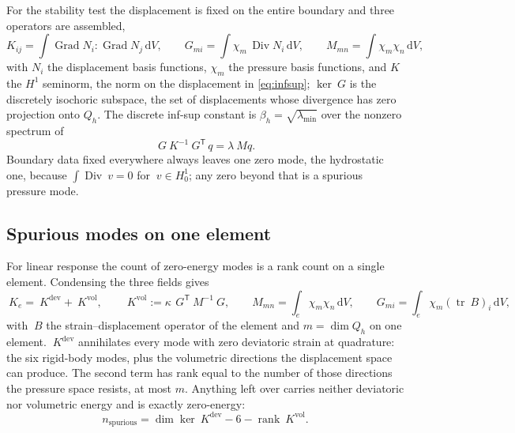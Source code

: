 \documentclass{article}
\newcommand{\Grad}{\operatorname{Grad}}
\newcommand{\Div}{\operatorname{Div}}
\newcommand{\trace}{\operatorname{tr}}
\newcommand{\transpose}[1]{#1^{\mathsf{T}}}
\newcommand{\diff}{\,\mathrm{d}}
\newcommand{\supvol}{^{\mathrm{vol}}}
\newcommand{\supdev}{^{\mathrm{dev}}}
\theoremstyle{definition}
\theoremstyle{plain}
\begin{document}
For the stability test the displacement is fixed on the entire boundary and
three operators are assembled,
\begin{equation}
  \label{eq:infsup-ops}
  K_{ij} = \int \Grad N_i : \Grad N_j \diff V,
  \qquad
  G_{mi} = \int \chi_m \, \Div N_i \diff V,
  \qquad
  M_{mn} = \int \chi_m \chi_n \diff V,
\end{equation}
with $N_i$ the displacement basis functions, $\chi_m$ the pressure basis
functions, and $K$ the $H^1$ seminorm, the norm on the displacement in
\eqref{eq:infsup}; $\ker ~G$ is the discretely isochoric subspace, the set of
displacements whose divergence has zero projection onto $Q_h$. The discrete inf-sup
constant is $\beta_h = \sqrt{\lambda_{\min}}$ over the nonzero spectrum of
\begin{equation}
  \label{eq:infsup-eig}
  ~G ~K^{-1} \transpose{~G}\, q = \lambda ~M q .
\end{equation}
Boundary data fixed everywhere always leaves one zero mode, the hydrostatic
one, because $\int \Div ~v = 0$ for $~v \in H^1_0$; any zero beyond
that is a spurious pressure mode.

\subsection{Spurious modes on one element}
\label{sec:firstresult}

For linear response the count of zero-energy modes is a rank count on a single
element. Condensing the three fields gives
\begin{equation}
  \label{eq:condensed}
  ~K_e = ~K\supdev + ~K\supvol,
  \qquad
  ~K\supvol := \kappa\, \transpose{~G} ~M^{-1} ~G,
  \qquad
  M_{mn} = \int_e \chi_m \chi_n \diff V,
  \qquad
  G_{mi} = \int_e \chi_m \left(\trace ~B\right)_i \diff V ,
\end{equation}
with $~B$ the strain--displacement operator of the element and $m = \dim Q_h$
on one element.
$~K\supdev$ annihilates every mode with zero deviatoric strain at quadrature:
the six rigid-body modes, plus the volumetric directions the displacement space
can produce. The second term has rank equal to the number of those directions
the pressure space resists, at most $m$. Anything left over carries neither
deviatoric nor volumetric energy and is exactly zero-energy:
\begin{equation}
  \label{eq:spurious}
  n_{\mathrm{spurious}} = \dim \ker ~K\supdev - 6 - \operatorname{rank} ~K\supvol .
\end{equation}
\end{document}
